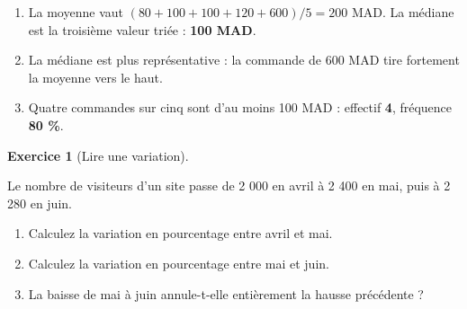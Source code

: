 \documentclass[
  french,
  letterpaper,
  open=any]{scrbook}
\providecommand{\tightlist}{%
  \setlength{\itemsep}{0pt}\setlength{\parskip}{0pt}}
\theoremstyle{definition}
\theoremstyle{definition}
\newtheorem{exercise}{Exercice}[section]
\theoremstyle{remark}
\begin{document}
\begin{tcolorbox}[enhanced jigsaw, arc=.35mm, bottomrule=.15mm, bottomtitle=1mm, breakable, colback=white, colbacktitle=quarto-callout-tip-color!10!white, colframe=quarto-callout-tip-color-frame, coltitle=black, left=2mm, leftrule=.75mm, opacityback=0, opacitybacktitle=0.6, rightrule=.15mm, title=\textcolor{quarto-callout-tip-color}{\faLightbulb}\hspace{0.5em}{Solution de l'exercice Exercice~\ref{exr-intro-ad-4}}, titlerule=0mm, toprule=.15mm, toptitle=1mm]

\begin{enumerate}
\def\labelenumi{\alph{enumi}.}
\tightlist
\item
  La moyenne vaut \((80+100+100+120+600)/5=200\) MAD. La médiane est la
  troisième valeur triée : \textbf{100 MAD}.
\item
  La médiane est plus représentative : la commande de 600 MAD tire
  fortement la moyenne vers le haut.
\item
  Quatre commandes sur cinq sont d'au moins 100 MAD : effectif
  \textbf{4}, fréquence \textbf{80 \%}.
\end{enumerate}

\end{tcolorbox}

\begin{exercise}[Lire une
variation]\protect\hypertarget{exr-intro-ad-5}{}\label{exr-intro-ad-5}

Le nombre de visiteurs d'un site passe de 2 000 en avril à 2 400 en mai,
puis à 2 280 en juin.

\begin{enumerate}
\def\labelenumi{\alph{enumi}.}
\tightlist
\item
  Calculez la variation en pourcentage entre avril et mai.
\item
  Calculez la variation en pourcentage entre mai et juin.
\item
  La baisse de mai à juin annule-t-elle entièrement la hausse précédente
  ?
\end{enumerate}

\end{exercise}
\end{document}
